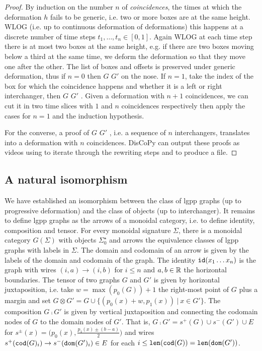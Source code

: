 \begin{proof}
By induction on the number $n$ of \emph{coincidences}, the times at which the deformation $h$ fails to be generic, i.e. two or more boxes are at the same height.
WLOG (i.e. up to continuous deformation of deformations) this happens at a discrete number of time steps $t_1, \dots, t_n \in [0, 1]$.
Again WLOG at each time step there is at most two boxes at the same height, e.g. if there are two boxes moving below a third at the same time, we deform the deformation so that they move one after the other.
The list of boxes and offsets is preserved under generic deformation, thus if $n = 0$ then  $G$  $G'$ \py{)} on the nose.
If $n = 1$, take  the index of the box for which the coincidence happens and  whether it is a left or right interchanger, then  $G$  $G'$ \py{)}.
Given a deformation with $n + 1$ coincidences, we can cut it in two time slices with $1$ and $n$ coincidences respectively then apply the cases for $n = 1$ and the induction hypothesis.

For the converse, a proof of  $G$  $G'$ \py{)}, i.e. a sequence of $n$ interchangers, translates into a deformation with $n$ coincidences.
DisCoPy can output these proofs as videos using  to iterate through the rewriting steps and  to produce a  file.
\end{proof}

\subsection{A natural isomorphism}

We have established an isomorphism between the class of lgpp graphs (up to progressive deformation) and the class of  objects (up to interchanger).
It remains to define lgpp graphs as the arrows of a monoidal category, i.e. to define identity, composition and tensor.
For every monoidal signature $\Sigma$, there is a monoidal category $G(\Sigma)$ with objects $\Sigma_0^\star$ and arrows the equivalence classes of lgpp graphs with labels in $\Sigma$.
The domain and codomain of an arrow is given by the labels of the domain and codomain of the graph.
The identity $\mathtt{id}(x_1 \dots x_n)$ is the graph with wires $(i, a) \to (i, b)$ for $i \leq n$ and $a, b \in \mathbb{R}$ the horizontal boundaries.
The tensor of two graphs $G$ and $G'$ is given by horizontal juxtaposition, i.e. take $w = \max(p_0(G)) + 1$ the right-most point of $G$ plus a margin and set $G \otimes G' = G \cup \{ (p_0(x) + w, p_1(x)) \ \vert \ x \in G' \}$.
The composition $G \fcmp G'$ is given by vertical juxtaposition and connecting the codomain nodes of $G$ to the domain nodes of $G'$.
That is, $G \fcmp G' = s^+(G) \cup s^-(G') \cup E$ for $s^\pm(x) = \big( p_0(x), \frac{p_1(x) \pm (b - a)}{2} \big)$ and wires $s^+(\mathtt{cod}(G)_i) \to s^-(\mathtt{dom}(G')_i) \in E$ for each $i \leq \mathtt{len}(\mathtt{cod}(G)) = \mathtt{len}(\mathtt{dom}(G'))$.

